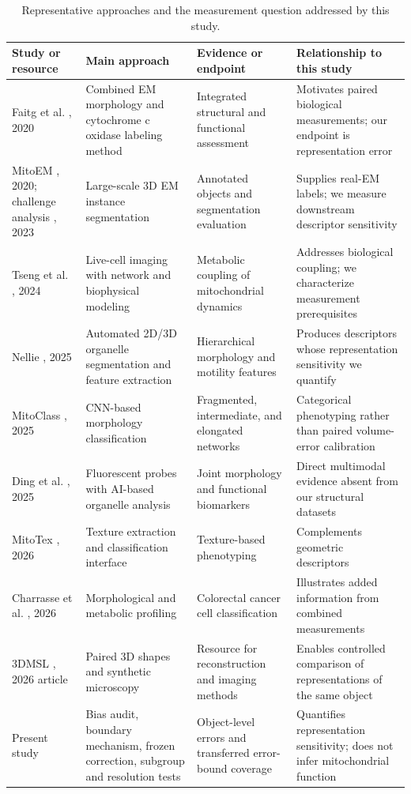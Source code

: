 \documentclass[journal]{IEEEtran}
\begin{document}
\begin{table}[!t]
\caption{Representative approaches and the measurement question addressed by this study.}
\label{tab:I}
\centering
\footnotesize
\setlength{\tabcolsep}{4pt}
\renewcommand{\arraystretch}{1.15}
\begin{tabularx}{\textwidth}{Y Y Y Y}
\toprule
\textbf{Study or resource} & \textbf{Main approach} & \textbf{Evidence or endpoint} & \textbf{Relationship to this study} \\
\midrule
Faitg et al. \cite{ref3}, 2020 & Combined EM morphology and cytochrome c oxidase labeling method & Integrated structural and functional assessment & Motivates paired biological measurements; our endpoint is representation error \\
MitoEM \cite{ref15}, 2020; challenge analysis \cite{ref16}, 2023 & Large-scale 3D EM instance segmentation & Annotated objects and segmentation evaluation & Supplies real-EM labels; we measure downstream descriptor sensitivity \\
Tseng et al. \cite{ref4}, 2024 & Live-cell imaging with network and biophysical modeling & Metabolic coupling of mitochondrial dynamics & Addresses biological coupling; we characterize measurement prerequisites \\
Nellie \cite{ref33}, 2025 & Automated 2D/3D organelle segmentation and feature extraction & Hierarchical morphology and motility features & Produces descriptors whose representation sensitivity we quantify \\
MitoClass \cite{ref9}, 2025 & CNN-based morphology classification & Fragmented, intermediate, and elongated networks & Categorical phenotyping rather than paired volume-error calibration \\
Ding et al. \cite{ref5}, 2025 & Fluorescent probes with AI-based organelle analysis & Joint morphology and functional biomarkers & Direct multimodal evidence absent from our structural datasets \\
MitoTex \cite{ref10}, 2026 & Texture extraction and classification interface & Texture-based phenotyping & Complements geometric descriptors \\
Charrasse et al. \cite{ref6}, 2026 & Morphological and metabolic profiling & Colorectal cancer cell classification & Illustrates added information from combined measurements \\
3DMSL \cite{ref11}, 2026 article & Paired 3D shapes and synthetic microscopy & Resource for reconstruction and imaging methods & Enables controlled comparison of representations of the same object \\
Present study & Bias audit, boundary mechanism, frozen correction, subgroup and resolution tests & Object-level errors and transferred error-bound coverage & Quantifies representation sensitivity; does not infer mitochondrial function \\
\bottomrule\end{tabularx}\end{table}
\end{document}
